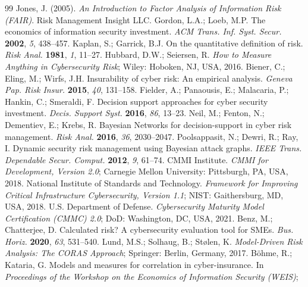 \documentclass[conference]{IEEEtran}
\begin{document}
  \begin{thebibliography}{99}
    Jones, J. (2005).
    \textit{An Introduction to Factor Analysis of Information Risk (FAIR)}.
    Risk Management Insight LLC.
    Gordon, L.A.; Loeb, M.P.
    The economics of information security investment.
    \textit{ACM Trans. Inf. Syst. Secur.} \textbf{2002}, \textit{5}, 438--457.
    Kaplan, S.; Garrick, B.J.
    On the quantitative definition of risk.
    \textit{Risk Anal.} \textbf{1981}, \textit{1}, 11--27.
    Hubbard, D.W.; Seiersen, R.
    \textit{How to Measure Anything in Cybersecurity Risk};
    Wiley: Hoboken, NJ, USA, 2016.
    Biener, C.; Eling, M.; Wirfs, J.H.
    Insurability of cyber risk: An empirical analysis.
    \textit{Geneva Pap. Risk Insur.} \textbf{2015}, \textit{40}, 131--158.
    Fielder, A.; Panaousis, E.; Malacaria, P.; Hankin, C.; Smeraldi, F.
    Decision support approaches for cyber security investment.
    \textit{Decis. Support Syst.} \textbf{2016}, \textit{86}, 13--23.
    Neil, M.; Fenton, N.; Dementiev, E.; Krebs, R.
    Bayesian Networks for decision-support in cyber risk management.
    \textit{Risk Anal.} \textbf{2016}, \textit{36}, 2030--2047.
    Poolsappasit, N.; Dewri, R.; Ray, I.
    Dynamic security risk management using Bayesian attack graphs.
    \textit{IEEE Trans. Dependable Secur. Comput.} \textbf{2012}, \textit{9}, 61--74.
    CMMI Institute.
    \textit{CMMI for Development, Version 2.0};
    Carnegie Mellon University: Pittsburgh, PA, USA, 2018.
    National Institute of Standards and Technology.
    \textit{Framework for Improving Critical Infrastructure Cybersecurity, Version 1.1};
    NIST: Gaithersburg, MD, USA, 2018.
    U.S. Department of Defense.
    \textit{Cybersecurity Maturity Model Certification (CMMC) 2.0};
    DoD: Washington, DC, USA, 2021.
    Benz, M.; Chatterjee, D.
    Calculated risk? A cybersecurity evaluation tool for SMEs.
    \textit{Bus. Horiz.} \textbf{2020}, \textit{63}, 531--540.
    Lund, M.S.; Solhaug, B.; Stølen, K.
    \textit{Model-Driven Risk Analysis: The CORAS Approach};
    Springer: Berlin, Germany, 2017.
    Böhme, R.; Kataria, G.
    Models and measures for correlation in cyber-insurance.
    In \textit{Proceedings of the Workshop on the Economics of Information Security (WEIS)};

\end{thebibliography}
\end{document}

